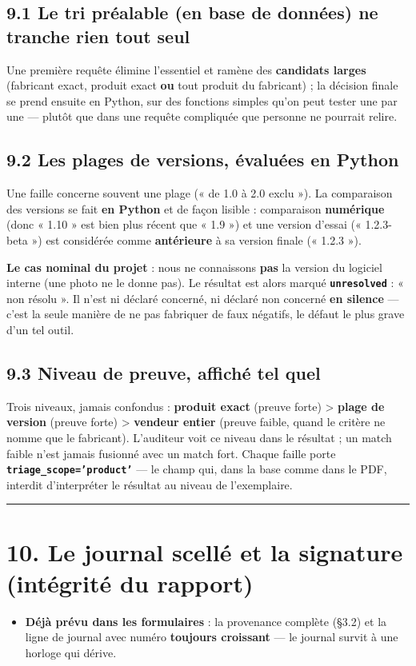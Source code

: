 \documentclass[11pt,a4paper]{article}
\begin{document}
\subsection*{9.1 Le tri préalable (en base de données) ne tranche rien tout seul}
Une première requête élimine l'essentiel et ramène des \textbf{candidats larges} (fabricant exact, produit exact \textbf{ou} tout produit du fabricant) ; la décision finale se prend ensuite en Python, sur des fonctions simples qu'on peut tester une par une — plutôt que dans une requête compliquée que personne ne pourrait relire.

\subsection*{9.2 Les plages de versions, évaluées en Python}
Une faille concerne souvent une plage (« de 1.0 à 2.0 exclu »). La comparaison des versions se fait \textbf{en Python} et de façon lisible : comparaison \textbf{numérique} (donc « 1.10 » est bien plus récent que « 1.9 ») et une version d'essai (« 1.2.3-beta ») est considérée comme \textbf{antérieure} à sa version finale (« 1.2.3 »).

\textbf{Le cas nominal du projet} : nous ne connaissons \textbf{pas} la version du logiciel interne (une photo ne le donne pas). Le résultat est alors marqué \textbf{\texttt{unresolved}} : « non résolu ». Il n'est ni déclaré concerné, ni déclaré non concerné \textbf{en silence} — c'est la seule manière de ne pas fabriquer de faux négatifs, le défaut le plus grave d'un tel outil.

\subsection*{9.3 Niveau de preuve, affiché tel quel}
Trois niveaux, jamais confondus : \textbf{produit exact} (preuve forte) > \textbf{plage de version} (preuve forte) > \textbf{vendeur entier} (preuve faible, quand le critère ne nomme que le fabricant). L'auditeur voit ce niveau dans le résultat ; un match faible n'est jamais fusionné avec un match fort. Chaque faille porte \textbf{\texttt{triage\_\allowbreak{}scope='product'}} — le champ qui, dans la base comme dans le PDF, interdit d'interpréter le résultat au niveau de l'exemplaire.

\medskip\hrule\medskip
\section*{10. Le journal scellé et la signature (intégrité du rapport)}
\begin{itemize}  \item \textbf{Déjà prévu dans les formulaires} : la provenance complète (§3.2) et la ligne de journal avec numéro \textbf{toujours croissant} — le journal survit à une horloge qui dérive.
\end{itemize}
\end{document}
